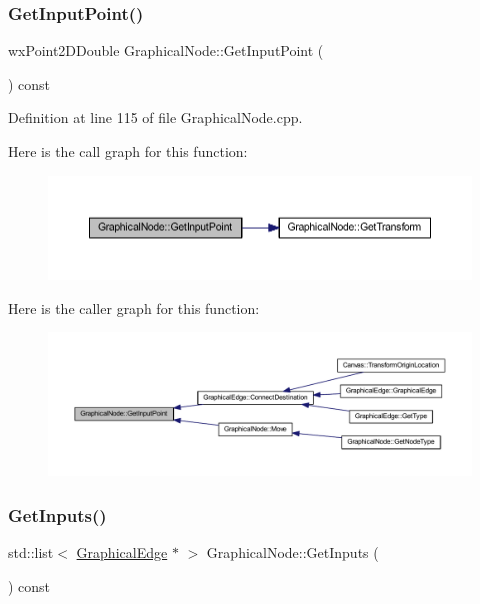 \subsubsection{\texorpdfstring{Get\+Input\+Point()}{GetInputPoint()}}
{\footnotesize\ttfamily wx\+Point2\+D\+Double Graphical\+Node\+::\+Get\+Input\+Point (\begin{DoxyParamCaption}{ }\end{DoxyParamCaption}) const\hspace{0.3cm}{\ttfamily [protected]}}



Definition at line 115 of file Graphical\+Node.\+cpp.

Here is the call graph for this function\+:
\nopagebreak
\begin{figure}[H]
\begin{center}
\leavevmode
\includegraphics[width=350pt]{class_graphical_node_a29991fc9117db0975aa1a61d0df48822_cgraph}
\end{center}
\end{figure}
Here is the caller graph for this function\+:
\nopagebreak
\begin{figure}[H]
\begin{center}
\leavevmode
\includegraphics[width=350pt]{class_graphical_node_a29991fc9117db0975aa1a61d0df48822_icgraph}
\end{center}
\end{figure}
\mbox{\label{class_graphical_node_a338a09b81d0be860210659f312fd5347}} 
\subsubsection{\texorpdfstring{Get\+Inputs()}{GetInputs()}}
{\footnotesize\ttfamily std\+::list$<$ \hyperlink{class_graphical_edge}{Graphical\+Edge} $\ast$ $>$ Graphical\+Node\+::\+Get\+Inputs (\begin{DoxyParamCaption}{ }\end{DoxyParamCaption}) const}




